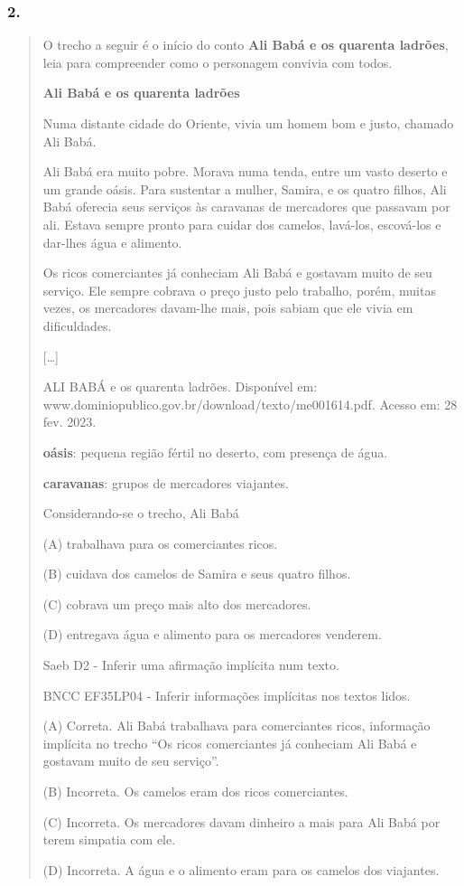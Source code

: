 \subsubsection{2. }\label{section-89}

\begin{quote}
O trecho a seguir é o início do conto \textbf{Ali Babá e os quarenta
ladrões}, leia para compreender como o personagem convivia com todos.

\textbf{Ali Babá e os quarenta ladrões}

Numa distante cidade do Oriente, vivia um homem bom e justo, chamado Ali
Babá.

Ali Babá era muito pobre. Morava numa tenda, entre um vasto deserto e um
grande oásis. Para sustentar a mulher, Samira, e os quatro filhos, Ali
Babá oferecia seus serviços às caravanas de mercadores que passavam por
ali. Estava sempre pronto para cuidar dos camelos, lavá-los, escová-los
e dar-lhes água e alimento.

Os ricos comerciantes já conheciam Ali Babá e gostavam muito de seu
serviço. Ele sempre cobrava o preço justo pelo trabalho, porém, muitas
vezes, os mercadores davam-lhe mais, pois sabiam que ele vivia em
dificuldades.

{[}\ldots{}{]}

ALI BABÁ e os quarenta ladrões. Disponível em:
www.dominiopublico.gov.br/download/texto/me001614.pdf. Acesso em: 28
fev. 2023.

\textbf{oásis}: pequena região fértil no deserto, com presença de água.

\textbf{caravanas}: grupos de mercadores viajantes.

Considerando-se o trecho, Ali Babá

\protect\hypertarget{_Hlk128465624}{}{}(A) trabalhava para os
comerciantes ricos.

(B) cuidava dos camelos de Samira e seus quatro filhos.

(C) cobrava um preço mais alto dos mercadores.

(D) entregava água e alimento para os mercadores venderem.

Saeb D2 - Inferir uma afirmação implícita num texto.

BNCC EF35LP04 - Inferir informações implícitas nos textos lidos.

(A) Correta. Ali Babá trabalhava para comerciantes ricos, informação
implícita no trecho ``Os ricos comerciantes já conheciam Ali Babá e
gostavam muito de seu serviço''.

(B) Incorreta. Os camelos eram dos ricos comerciantes.

(C) Incorreta. Os mercadores davam dinheiro a mais para Ali Babá por
terem simpatia com ele.

(D) Incorreta. A água e o alimento eram para os camelos dos viajantes.
\end{quote}

